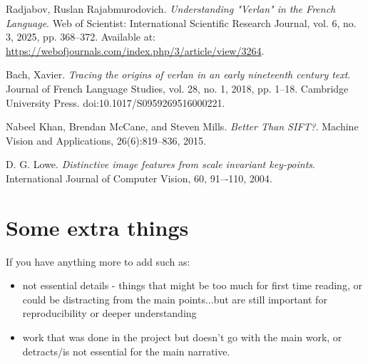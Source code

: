 \documentclass[12pt]{article}
\begin{document}



\begin{thebibliography}{9}

Radjabov, Ruslan Rajabmurodovich. \textit{Understanding "Verlan" in the French Language}. 
Web of Scientist: International Scientific Research Journal, vol. 6, no. 3, 2025, pp. 368–372. 
Available at: \url{https://webofjournals.com/index.php/3/article/view/3264}.

Bach, Xavier. \textit{Tracing the origins of verlan in an early nineteenth century text}. 
Journal of French Language Studies, vol. 28, no. 1, 2018, pp. 1–18. 
Cambridge University Press. doi:10.1017/S0959269516000221.

Nabeel Khan, Brendan McCane, and Steven Mills. \textit{Better Than SIFT?}. Machine Vision and Applications, 26(6):819--836, 2015.

D. G. Lowe. \textit{Distinctive image features from scale invariant key-points}. International Journal of Computer Vision, 60, 91–-110, 2004.

\end{thebibliography}


\appendix

\renewcommand{\thesection}{Appendix \Alph{section}}

\section{Some extra things}

If you have anything more to add such as:
\begin{itemize}
\item not essential details - things that might be too much for first time reading, or could be distracting from the main points...but are still important for reproducibility or deeper understanding
\item work that was done in the project but doesn't go with the main work, or detracts/is not essential for the main narrative.  
\end{itemize}
\end{document}
